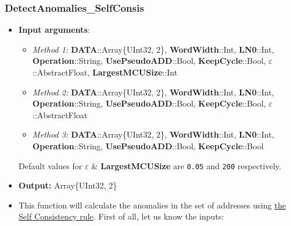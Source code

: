 \subsubsection*{DetectAnomalies\_SelfConsis}\label{Fun:DetectAnomaliesSelfConsis}
\begin{itemize}
	\item \textbf{Input arguments}:
	\begin{itemize}
		\item  \textit{Method 1: }\textbf{DATA}::Array\{UInt32, 2\}, 
		\textbf{WordWidth}::Int,
		\textbf{LN0}::Int,
		\textbf{Operation}::String,
		\textbf{UsePseudoADD}::Bool,
		\textbf{KeepCycle}::Bool,
		\textbf{\(\varepsilon\)}::AbstractFloat,
		\textbf{LargestMCUSize}::Int
		\item  \textit{Method 2: }\textbf{DATA}::Array\{UInt32, 2\}, 
		\textbf{WordWidth}::Int,
		\textbf{LN0}::Int,
		\textbf{Operation}::String,
		\textbf{UsePseudoADD}::Bool,
		\textbf{KeepCycle}::Bool,
		\textbf{\(\varepsilon\)}::AbstractFloat
		\item  \textit{Method 3: }\textbf{DATA}::Array\{UInt32, 2\}, 
		\textbf{WordWidth}::Int,
		\textbf{LN0}::Int,
		\textbf{Operation}::String,
		\textbf{UsePseudoADD}::Bool,
		\textbf{KeepCycle}::Bool
	\end{itemize}

	Default values for \textbf{\(\varepsilon\)} \& 	\textbf{LargestMCUSize} are \texttt{0.05} and \texttt{200} respectively.
	\item \textbf{Output: } Array\{UInt32, 2\}	
	\item This function will calculate the anomalies in the set of addresses using \hyperref[Subsec:SelfConsistencyRule]{the Self Consistency rule}. 
	 First of all, let us know the inputs:
	 \begin{itemize}
	

\end{itemize}
\end{itemize}
